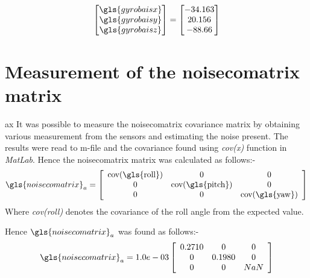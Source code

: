 				\begin{equation}
				\begin{bmatrix}
				\gls{gyrobaisx}\\ \gls{gyrobaisy}\\\gls{gyrobaisz}
				\end{bmatrix} 
				=
				\begin{bmatrix}
				-34.163 \\ 20.156  \\-88.66
				\end{bmatrix}
				\end{equation}
	 \tocless\section{Measurement of the \gls{noisecomatrix} matrix}
ax It was possible to measure the \gls{noisecomatrix}  covariance matrix by obtaining various measurement from the sensors and estimating the noise present. The results were read to m-file and the covariance found using \textit{cov(x)} function in \textit{MatLab}. Hence the \gls{noisecomatrix}  matrix was calculated as follows:-
					\begin{equation}
			\gls{noisecomatrix}_a  = 		
                   \left[\begin{array}{ccc}
					\mathrm{cov(\gls{roll})}       &                 0                          & 0\\ 
					                                     0       & \mathrm{cov(\gls{pitch})}           & 0\\
					                                      0         &                0                          &\mathrm{cov(\gls{yaw})}
					\end{array} \right]
					\end{equation}
					Where \textit{cov(\gls{roll})} denotes the covariance of the \gls{roll} angle from the expected value.
	
Hence $\gls{noisecomatrix}_a$ was found as follows:-
						\begin{equation}
						\gls{noisecomatrix}_a  = 		
						1.0e-03\left[\begin{array}{ccc}
						0.2710      &                 0                          & 0\\ 
						0       & 0.1980           & 0\\
						0         &                0                          &NaN
						\end{array} \right]
						\end{equation}

